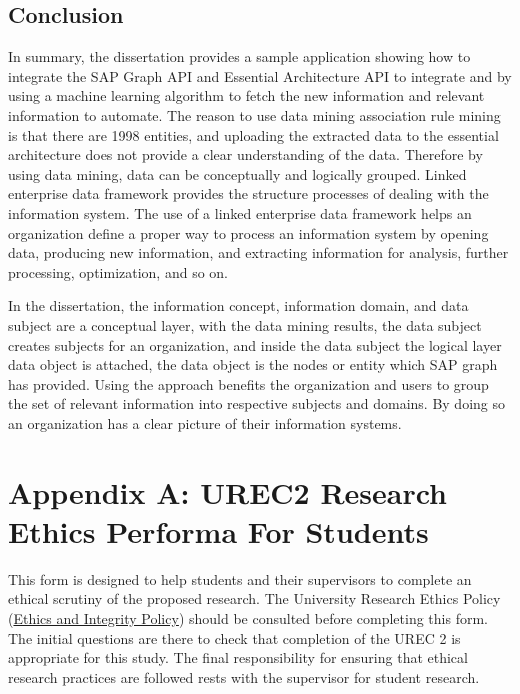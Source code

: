 \documentclass{article}
\begin{document}
\subsection{Conclusion}

In summary, the dissertation provides a sample application showing how to integrate the SAP Graph API and Essential Architecture API to integrate and by using a machine learning algorithm to fetch the new information and relevant information to automate. The reason to use data mining association rule mining is that there are 1998 entities, and uploading the extracted data to the essential architecture does not provide a clear understanding of the data. Therefore by using data mining, data can be conceptually and logically grouped. Linked enterprise data framework provides the structure processes of dealing with the information system. The use of a linked enterprise data framework helps an organization define a proper way to process an information system by opening data, producing new information, and extracting information for analysis, further processing, optimization, and so on. \parencite{galkin2016}

In the dissertation, the information concept, information domain, and data subject are a conceptual layer, with the data mining results, the data subject creates subjects for an organization, and inside the data subject the logical layer data object is attached, the data object is the nodes or entity which SAP graph has provided. Using the approach benefits the organization and users to group the set of relevant information into respective subjects and domains. By doing so an organization has a clear picture of their information systems.

\newpage
\printbibliography

\newpage
\appendix

\section{Appendix A: UREC2 Research Ethics Performa For Students}


This form is designed to help students and their supervisors to complete an ethical scrutiny of the proposed research. The University Research Ethics Policy (\href{www.shu.ac.uk/research/excellence/ethics-and-integrity/policies}{Ethics and Integrity Policy}) should be consulted before completing this form. The initial questions are there to check that completion of the UREC 2 is appropriate for this study. The final responsibility for ensuring that ethical research practices are followed rests with the supervisor for student research.
\end{document}
